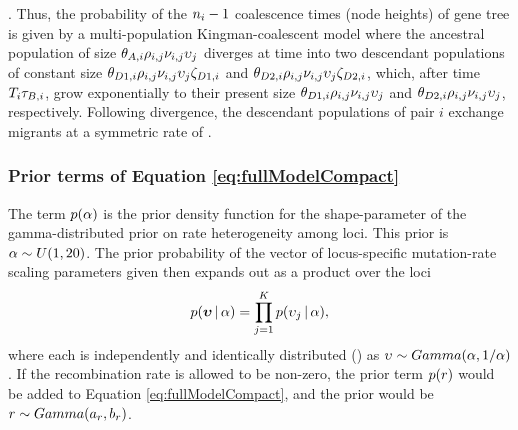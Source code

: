 \begin{linenomath}
\migrationRate{}.
Thus, the probability of the $\popSampleSize{i}{}-1$ coalescence times (node
heights) of gene tree  is given by a multi-population
Kingman-coalescent model \citep{Kingman1982} where the ancestral population of
size
$\ancestralTheta{i}\ploidyScalar{i}{j}\mutationRateScalarConstant{i}{j}\locusMutationRateScalar{j}$
diverges at time  into two descendant populations of constant
size
$\descendantTheta{1}{i}\ploidyScalar{i}{j}\mutationRateScalarConstant{i}{j}\locusMutationRateScalar{j}\bottleScalar{1}{i}$
and
$\descendantTheta{2}{i}\ploidyScalar{i}{j}\mutationRateScalarConstant{i}{j}\locusMutationRateScalar{j}\bottleScalar{2}{i}$,
which, after time $\divTimeMap{i}\bottleTime{i}$, grow exponentially to their
present size 
$\descendantTheta{1}{i}\ploidyScalar{i}{j}\mutationRateScalarConstant{i}{j}\locusMutationRateScalar{j}$
and
$\descendantTheta{2}{i}\ploidyScalar{i}{j}\mutationRateScalarConstant{i}{j}\locusMutationRateScalar{j}$,
respectively.
Following divergence, the descendant populations of pair $i$ exchange migrants at a symmetric rate of
.
\end{linenomath}


\subsubsection*{Prior terms of Equation \ref{eq:fullModelCompact}}
\begin{linenomath}
The term $p(\alpha)$ is the prior density
function for the shape-parameter of the gamma-distributed prior on
rate heterogeneity among loci.
This prior is $\alpha \sim U(1, 20)$.
The prior probability of the vector of locus-specific mutation-rate scaling parameters
given \locusRateHetShapeParameter then expands out as a product over
the loci
\begin{equation}
    p(\boldsymbol{\upsilon} \,|\, \alpha) =
    \prod_{j=1}^{K}
    p(\upsilon_{j} \,|\, \alpha),
    \label{eq:locusRateHetPrior}
\end{equation}
where each \locusMutationRateScalar{} is independently and identically
distributed (\iid) as
$\upsilon_{} \sim Gamma(\alpha,
1/\alpha)$.
If the recombination rate \recombinationRate is allowed to be
non-zero, the prior term $p(r)$ would be added
to Equation \ref{eq:fullModelCompact}, and the prior would be
$r \sim Gamma(a_{r},
b_{r})$.
\end{linenomath}

